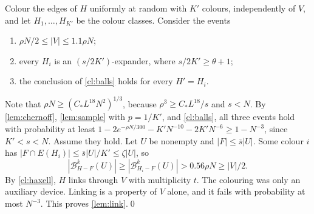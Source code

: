 \documentclass[11pt]{article}
\theoremstyle{definition}
\theoremstyle{remark}
\numberwithin{equation}{section}
\numberwithin{figure}{section}
\numberwithin{table}{section}
\newcommand{\cB}{\mathcal{B}}
\begin{document}
Colour the edges of $H$ uniformly at random with $K'$ colours, independently of
$V$, and let $H_1,\dots,H_{K'}$ be the colour classes. Consider the events
\begin{enumerate}[label=(E\arabic*),itemsep=1pt]
\item $\rho N/2\le|V|\le1.1\rho N$;
\item every $H_i$ is an $(s/2K')$-expander, where $s/2K'\ge\theta+1$;
\item the conclusion of \cref{cl:balls} holds for every $H'=H_i$.
\end{enumerate}
Note that $\rho N\ge(C_*L^{18}N^2)^{1/3}$, because $\rho^3\ge C_*L^{18}/s$ and
$s<N$. By \cref{lem:chernoff}, \cref{lem:sample} with $p=1/K'$, and
\cref{cl:balls}, all three events hold with probability at least
$1-2e^{-\rho N/300}-K'N^{-10}-2K'N^{-6}\ge1-N^{-3}$, since $K'<s<N$. Assume they
hold. Let $U$ be nonempty and $|F|\le\bar s|U|$. Some colour $i$ has
$|F\cap E(H_i)|\le\bar s|U|/K'\le\zeta|U|$, so
\[
|\cB^k_{H-F}(U)|\ge|\cB^k_{H_i-F}(U)|>0.56\rho N\ge|V|/2.
\]
By \cref{cl:haxell}, $H$ links through $V$ with multiplicity $t$. The colouring
was only an auxiliary device. Linking is a property of $V$ alone, and it fails
with probability at most $N^{-3}$. This proves \cref{lem:link}.\qed
\end{document}
